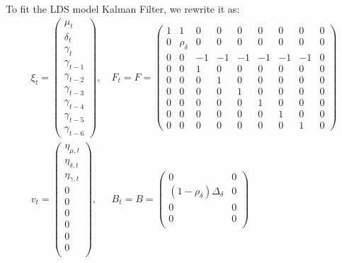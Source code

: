 \documentclass[10pt]{article}
\numberwithin{equation}{section}
\begin{document}
To fit the LDS model Kalman Filter, we rewrite it as:
\begin{align*}
    \xi_t = \begin{pmatrix}
        \mu_t \\
        \delta_t \\
        \gamma_t \\
        \gamma_{t-1} \\
        \gamma_{t-2} \\
        \gamma_{t-3} \\
        \gamma_{t-4} \\
        \gamma_{t-5} \\
        \gamma_{t-6}
    \end{pmatrix}, 
    &\ 
    F_t = F = \begin{pmatrix}
        1 & 1  & 0 & 0 & 0 & 0 & 0 & 0 & 0 \\
        0 & \rho_{\delta}  & 0 & 0 & 0 & 0 & 0 & 0 & 0 \\
        0 & 0 & -1 & -1 & -1 & -1 & -1 & -1 & 0 \\
        0 & 0 & 1 & 0 & 0 & 0 & 0 & 0 & 0 \\
        0 & 0 & 0 & 1 & 0 & 0 & 0 & 0 & 0 \\
        0 & 0 & 0 & 0 & 1 & 0 & 0 & 0 & 0 \\
        0 & 0 & 0 & 0 & 0 & 1 & 0 & 0 & 0 \\
        0 & 0 & 0 & 0 & 0 & 0 & 1 & 0 & 0 \\
        0 & 0 & 0 & 0 & 0 & 0 & 0 & 1 & 0
    \end{pmatrix} \\
    v_t = \begin{pmatrix}
        \eta_{\mu,t} \\
        \eta_{\delta,t} \\
        \eta_{\gamma,t} \\
        0 \\
        0 \\
        0 \\
        0 \\
        0 \\
        0 \\
    \end{pmatrix},
    &\ 
    B_t = B = \begin{pmatrix}
        0 & 0 \\
        (1-\rho_{\delta})\Delta_{\delta} & 0 \\
        0 & 0 \\
        0 & 0 \\

\end{pmatrix}
\end{align*}
\end{document}
